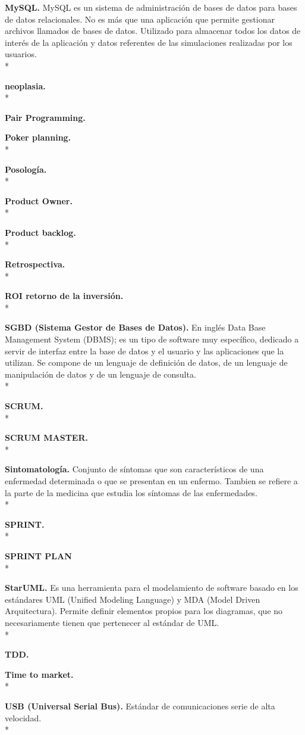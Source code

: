 \documentclass[../pfc.tex]{subfiles}
\begin{document}
	\textbf{MySQL.}
	MySQL es un sistema de administración de bases de datos para bases de datos relacionales. No es más que una aplicación que permite gestionar archivos llamados de bases de datos. Utilizado para almacenar todos los datos de interés de la aplicación y datos referentes de las simulaciones realizadas por los usuarios.\\*
	
	\textbf{neoplasia.}\\*

	\textbf{Pair Programming.}
	
	\textbf{Poker planning.}\\*

	\textbf{Posología.}\\*

	\textbf{Product Owner.}\\*
	
	\textbf{Product backlog.}\\*

	\textbf{Retrospectiva.}\\*	

	\textbf{ROI retorno de la inversión.}\\*	
	
	\textbf{SGBD (Sistema Gestor de Bases de Datos).}
	En inglés Data Base Management System (DBMS); es un tipo de software muy específico, dedicado a servir de interfaz entre la base de datos y el usuario y las aplicaciones que la utilizan. Se compone de un lenguaje de definición de datos, de un lenguaje de manipulación de datos y de un lenguaje de consulta.\\*
	
	\textbf{SCRUM.}\\*
	
	\textbf{SCRUM MASTER.}\\*	
	
	\textbf{Sintomatología.}
	Conjunto de síntomas que son característicos de una enfermedad determinada o que se presentan en un enfermo.
	Tambien se refiere a la parte de la medicina que estudia los síntomas de las enfermedades.\\*
		
		
	\textbf{SPRINT.}\\*
	
	\textbf{SPRINT PLAN}\\*
	
	\textbf{StarUML.}
	Es una herramienta para el modelamiento de software basado en los estándares UML (Unified Modeling Language) y MDA (Model Driven Arquitectura). Permite definir elementos propios para los diagramas, que no necesariamente tienen que pertenecer al estándar de UML.\\*
	
	\textbf{TDD.}

	\textbf{Time to market.}\\*

	\textbf{USB (Universal Serial Bus).}
	Estándar de comunicaciones serie de alta velocidad. \\*
	
\end{document}
